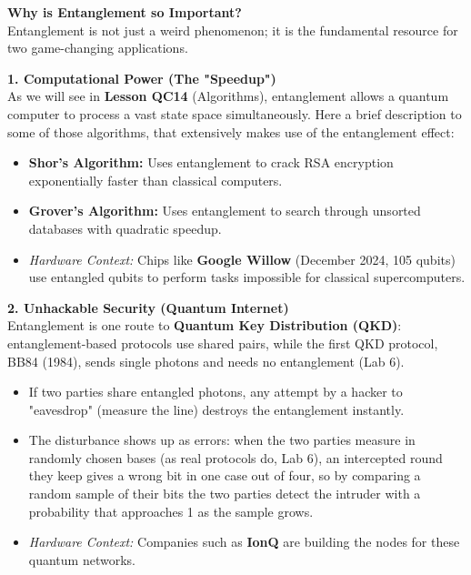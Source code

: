 \documentclass[a4paper,11pt]{article}
\begin{document}
\begin{deepdivebox}
\textbf{Why is Entanglement so Important? }\\
Entanglement is not just a weird phenomenon; it is the fundamental resource for two game-changing applications.

\vspace{0.2cm}
\textbf{1. Computational Power (The "Speedup")}\\
As we will see in \textbf{Lesson QC14} (Algorithms), entanglement allows a quantum computer to process a vast state space simultaneously. Here a brief description to some of those algorithms, that extensively makes use of the entanglement effect:
\begin{itemize}
    \item \textbf{Shor's Algorithm:} Uses entanglement to crack RSA encryption exponentially faster than classical computers.
    \item \textbf{Grover's Algorithm:} Uses entanglement to search through unsorted databases with quadratic speedup.
    \item \textit{Hardware Context:} Chips like \textbf{Google Willow} (December 2024, 105 qubits) use entangled qubits to perform tasks impossible for classical supercomputers.
\end{itemize}

\vspace{0.2cm}
\textbf{2. Unhackable Security (Quantum Internet)}\\
Entanglement is one route to \textbf{Quantum Key Distribution (QKD)}: entanglement-based protocols use shared pairs, while the first QKD protocol, BB84 (1984), sends single photons and needs no entanglement (Lab 6).
\begin{itemize}
    \item If two parties share entangled photons, any attempt by a hacker to "eavesdrop" (measure the line) destroys the entanglement instantly.
    \item The disturbance shows up as errors: when the two parties measure in randomly chosen bases (as real protocols do, Lab 6), an intercepted round they keep gives a wrong bit in one case out of four, so by comparing a random sample of their bits the two parties detect the intruder with a probability that approaches 1 as the sample grows.
    \item \textit{Hardware Context:} Companies such as \textbf{IonQ} are building the nodes for these quantum networks.
\end{itemize}
\end{deepdivebox}
\end{document}

